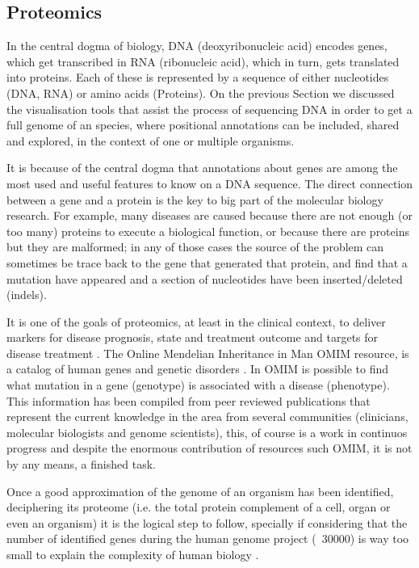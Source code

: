 \subsection{Proteomics}
In the central dogma of biology, DNA (deoxyribonucleic acid) encodes genes, which get transcribed in RNA (ribonucleic acid), which in turn, gets translated into proteins. Each of these is represented by a sequence of either nucleotides (DNA, RNA) or amino acids (Proteins). On the previous Section we discussed the visualisation tools that assist the process of sequencing DNA in order to get a full genome of an species, where positional annotations can be included, shared and explored, in the context of one or multiple organisms. 

It is because of the central dogma that annotations about genes are among the most used and useful features to know on a DNA sequence. The direct connection between a gene and a protein is the key to big part of the molecular biology research. For example, many diseases are caused because there are not enough (or too many) proteins to execute a biological function, or because there are proteins but they are malformed; in any of those cases the source of the problem can sometimes be trace back to the gene that generated that protein, and find that a mutation have appeared and a section of nucleotides have been inserted/deleted (indels). 

It is one of the goals of proteomics, at least in the clinical context, to deliver markers for disease prognosis, state and treatment outcome and targets for disease treatment \cite{MIS2007}. The Online Mendelian Inheritance in Man OMIM resource, is a catalog of human genes and genetic disorders \cite{AMB2014}. In OMIM is possible to find what mutation in a gene (genotype) is associated with a disease (phenotype). This information has been compiled from peer reviewed publications that represent the current knowledge in the area from several communities (clinicians, molecular biologists and genome scientists), this, of course is a work in continuos progress and despite the enormous contribution of resources such OMIM, it is not by any means, a finished task.

Once a good approximation of the genome of an organism has been identified, deciphering its proteome (i.e. the total protein complement of a cell, organ or even an organism) it is the logical step to follow, specially if considering that the number of identified genes during the human genome project (~30000) is way too small to explain the complexity of human biology \cite{PAN2008}.

